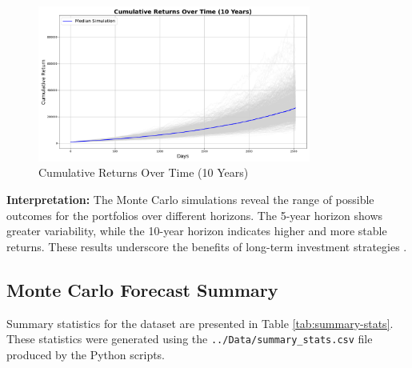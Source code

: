\begin{figure}[!htbp]
    \centering
    \includegraphics[width=0.8\textwidth]{../Figures/cumulative_returns_over_time_10_years.png}
    \caption{Cumulative Returns Over Time (10 Years)}
    \label{fig:cumulative_returns_10y}
\end{figure}

\textbf{Interpretation:} The Monte Carlo simulations reveal the range of possible outcomes for the portfolios over different horizons. The 5-year horizon shows greater variability, while the 10-year horizon indicates higher and more stable returns. These results underscore the benefits of long-term investment strategies \citep{glasserman2004monte}.

\subsection{Monte Carlo Forecast Summary}
Summary statistics for the dataset are presented in Table \ref{tab:summary-stats}. These statistics were generated using the \texttt{../Data/summary\_stats.csv} file produced by the Python scripts.

